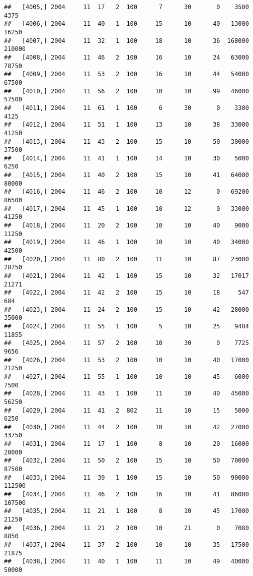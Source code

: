 \documentclass{article}\usepackage[]{graphicx}\usepackage[]{color}
\makeatletter
\newenvironment{kframe}{%
 \def\at@end@of@kframe{}%
 \ifinner\ifhmode%
  \def\at@end@of@kframe{\end{minipage}}%
  \begin{minipage}{\columnwidth}%
 \fi\fi%
 \def\FrameCommand##1{\hskip\@totalleftmargin \hskip-\fboxsep
 \colorbox{shadecolor}{##1}\hskip-\fboxsep
     \hskip-\linewidth \hskip-\@totalleftmargin \hskip\columnwidth}%
 \MakeFramed {\advance\hsize-\width
   \@totalleftmargin\z@ \linewidth\hsize
   \@setminipage}}%
 {\par\unskip\endMakeFramed%
 \at@end@of@kframe}
\newenvironment{knitrout}{}{} %
\makeatother
\begin{document}
\begin{knitrout}
\begin{kframe}
\begin{verbatim}
##   [4005,] 2004     11  17   2  100      7      30       0    3500    4375
##   [4006,] 2004     11  40   1  100     15      10      40   13000   16250
##   [4007,] 2004     11  32   1  100     18      10      36  168000  210000
##   [4008,] 2004     11  46   2  100     16      10      24   63000   78750
##   [4009,] 2004     11  53   2  100     16      10      44   54000   67500
##   [4010,] 2004     11  56   2  100     10      10      99   46000   57500
##   [4011,] 2004     11  61   1  100      6      30       0    3300    4125
##   [4012,] 2004     11  51   1  100     13      10      38   33000   41250
##   [4013,] 2004     11  43   2  100     15      10      50   30000   37500
##   [4014,] 2004     11  41   1  100     14      10      30    5000    6250
##   [4015,] 2004     11  40   2  100     15      10      41   64000   80000
##   [4016,] 2004     11  46   2  100     10      12       0   69200   86500
##   [4017,] 2004     11  45   1  100     10      12       0   33000   41250
##   [4018,] 2004     11  20   2  100     10      10      40    9000   11250
##   [4019,] 2004     11  46   1  100     10      10      40   34000   42500
##   [4020,] 2004     11  80   2  100     11      10      87   23000   28750
##   [4021,] 2004     11  42   1  100     15      10      32   17017   21271
##   [4022,] 2004     11  42   2  100     15      10      18     547     684
##   [4023,] 2004     11  24   2  100     15      10      42   28000   35000
##   [4024,] 2004     11  55   1  100      5      10      25    9484   11855
##   [4025,] 2004     11  57   2  100     10      30       0    7725    9656
##   [4026,] 2004     11  53   2  100     10      10      40   17000   21250
##   [4027,] 2004     11  55   1  100     10      10      45    6000    7500
##   [4028,] 2004     11  43   1  100     11      10      40   45000   56250
##   [4029,] 2004     11  41   2  802     11      10      15    5000    6250
##   [4030,] 2004     11  44   2  100     10      10      42   27000   33750
##   [4031,] 2004     11  17   1  100      8      10      20   16000   20000
##   [4032,] 2004     11  50   2  100     15      10      50   70000   87500
##   [4033,] 2004     11  39   1  100     15      10      50   90000  112500
##   [4034,] 2004     11  46   2  100     16      10      41   86000  107500
##   [4035,] 2004     11  21   1  100      8      10      45   17000   21250
##   [4036,] 2004     11  21   2  100     10      21       0    7080    8850
##   [4037,] 2004     11  37   2  100     10      10      35   17500   21875
##   [4038,] 2004     11  40   1  100     11      10      49   40000   50000

\end{verbatim}
\end{kframe}
\end{knitrout}
\end{document}
